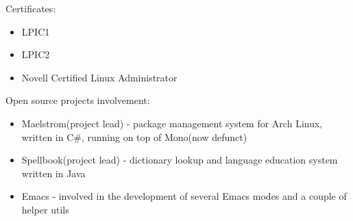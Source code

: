 \ecvitem{}
{
  Certificates:
  \begin{itemize}
    \item LPIC1
    \item LPIC2
    \item Novell Certified Linux Administrator
  \end{itemize}
  Open source projects involvement:
  \begin{itemize}
    \item Maelstrom(project lead) - package management system for Arch Linux,
      written in C\#, running on top of Mono(now defunct)
    \item Spellbook(project lead) - dictionary lookup and language
      education system written in Java
    \item Emacs - involved in the development of several Emacs modes
      and a couple of helper utils
  \end{itemize}

}
